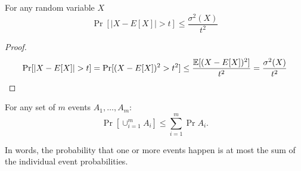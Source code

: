 \documentclass{article}
\begin{document}
\begin{fact}%
For any random variable $X$
\begin{equation}
\Pr[|X-E[X]| > t] \le \frac{\sigma^2(X)}{t^2}
\end{equation}
\end{fact}
\begin{proof}
\[
\Pr[|X-E[X]| > t]  = \Pr[(X-E[X])^2 > t^2] \le \frac{{\mathbb E}[(X-E[X])^2]}{t^2} = \frac{\sigma^2(X)}{t^2}
\]
\end{proof}

\begin{lemma}
For any set of $m$ events $A_1,\ldots,A_m$:
\[
\Pr[\cup_{i=1}^{m}A_i] \le \sum_{i=1}^{m}\Pr{A_i}.
\]
\end{lemma}
In words, the probability that one or more events happen is at most the sum of the 
individual event probabilities. 
\end{document}

